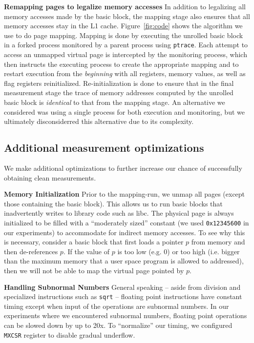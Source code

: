 \textbf{Remapping pages to legalize memory accesses}
In addition to legalizing all memory accesses made by the basic block,
the mapping stage also ensures that all memory accesses stay in
the L1 cache.
Figure~\ref{fig:code} shows the algorithm we use to do page mapping.
Mapping is done by executing the unrolled basic block in a forked process
 monitored by a parent process using \verb|ptrace|.
Each attempt to access an unmapped virtual page is intercepted by
the monitoring process, which then instructs the 
executing process to create the appropriate mapping
and to restart execution from the \textit{beginning}
with all registers, memory values,
as well as flag registers reinitialized.
Re-initialization is done to ensure that in the final measurement
stage the trace of memory addresses computed by the 
unrolled basic block is \textit{identical} to that from the mapping stage.
An alternative we considered was using a single process for both execution
and monitoring, but we ultimately disconsiderred this alternative due to
its complexity.

\subsection{Additional measurement optimizations}
We make additional optimizations to further increase our chance
of successfully obtaining clean measurements.

\textbf{Memory Initialization} 
Prior to the mapping-run,
we unmap all pages (except those containing the basic block).
This allows us to run basic blocks that inadvertently
writes to library code such as libc.
The physical page is
always initialized to be filled with a “moderately sized” constant
(we used \verb|0x12345600| in our experiments)
to accommodate for indirect memory accesses.
To see why this is necessary,
consider a basic block that first loads a pointer $p$ from memory
and then de-references $p$.
If the value of $p$ is too low (e.g. 0)
or too high
(i.e. bigger than the maximum memory that
a user space program is allowed to addressed),
then we will not be able to map the virtual page pointed by $p$.

\textbf{Handling Subnormal Numbers}
General speaking -- aside from division
and specialized instructions such as \verb|sqrt|
-- floating point instructions have constant timing
except when input of the operations are subnormal numbers.
In our experiments where we encountered subnormal numbers,
floating point operations can be slowed down by up to 20x.
To ``normalize'' our timing, we configured \verb|MXCSR| register
to disable gradual underflow.

